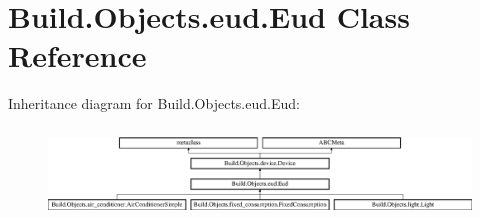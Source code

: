 \hypertarget{class_build_1_1_objects_1_1eud_1_1_eud}{}\section{Build.\+Objects.\+eud.\+Eud Class Reference}
\label{class_build_1_1_objects_1_1eud_1_1_eud}
Inheritance diagram for Build.\+Objects.\+eud.\+Eud\+:\begin{figure}[H]
\begin{center}
\leavevmode
\includegraphics[height=2.408602cm]{class_build_1_1_objects_1_1eud_1_1_eud}
\end{center}
\end{figure}
